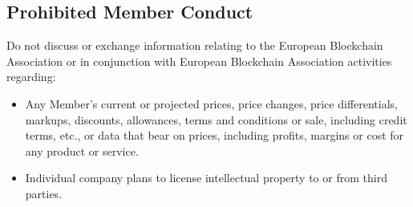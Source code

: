 \documentclass{article}
\begin{document}
\subsection{Prohibited Member Conduct}

Do not discuss or exchange information relating to the European Blockchain Association or in conjunction with European Blockchain Association activities regarding:

\begin{itemize}
	\item Any Member’s current or projected prices, price changes, price differentials, markups, discounts, allowances, terms and conditions or sale, including credit terms, etc., or data that bear on prices, including profits, margins or cost for any product or service.
	\item Individual company plans to license intellectual property to or from third parties.
\end{itemize}
\end{document}
